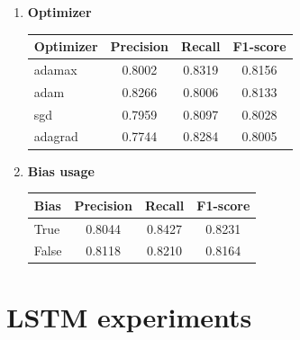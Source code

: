 \begin{enumerate}
        
    \item \textbf{Optimizer}\\
        \vspace{-0.5cm}
        \begin{table}[htbp]
            \centering
            \begin{tabular}{l|c|c|c}
                \textbf{Optimizer} & \textbf{Precision} & \textbf{Recall} & \textbf{F1-score} \\ \hline
                    adamax  &	0.8002    &	0.8319    &	0.8156 \\
                    adam    &	0.8266    &	0.8006    &	0.8133 \\
                    sgd     &	0.7959    &	0.8097    &	0.8028 \\
                    adagrad &	0.7744    &	0.8284    &	0.8005 \\
            \end{tabular}
        \end{table}


    \item \textbf{Bias usage}\\
        \vspace{-0.5cm}
        \begin{table}[htbp]
            \centering
            \begin{tabular}{l|c|c|c}
                \textbf{Bias} & \textbf{Precision} & \textbf{Recall} & \textbf{F1-score} \\ \hline
                True    &	0.8044    &	0.8427    &	0.8231 \\
                False   &	0.8118    &	0.8210    &	0.8164 \\
            \end{tabular}
        \end{table}
        
        
    \end{enumerate}


\chapter{LSTM experiments}
\label{annex:lstm-experiments}


